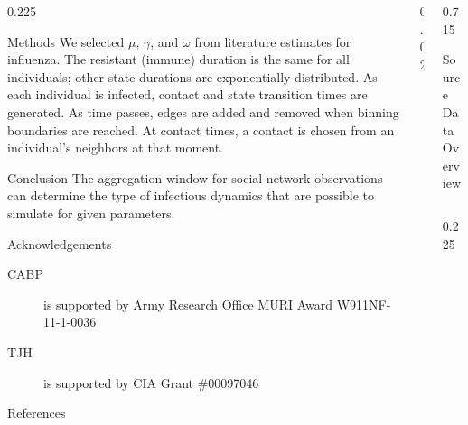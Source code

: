\documentclass[final]{beamer} %
\newcommand{\spaceProp}{0.02}
\newcommand{\spacer}{\begin{column}{\spaceProp\paperwidth}\end{column}}
\newenvironment{oneCol}{\begin{column}[t]{0.225\paperwidth}}{\end{column}}
\newenvironment{threeCol}{\begin{column}[t]{0.715\paperwidth}}{\end{column}}
\begin{document}
\begin{frame}{}
\begin{columns}[t]
\begin{oneCol}
\begin{block}{Methods}
We selected $\mu$, $\gamma$, and $\omega$ from literature estimates for influenza.  The resistant (immune) duration is the same for all individuals; other state durations are exponentially distributed.  As each individual is infected, contact and state transition times are generated.  As time passes, edges are added and removed when binning boundaries are reached.  At contact times, a contact is chosen from an individual's neighbors at that moment. 
    \end{block}
    \begin{block}{Conclusion}
The aggregation window for social network observations can determine the type of infectious dynamics that are possible to simulate for given parameters.
    \end{block}
    \begin{block}{Acknowledgements}
      \begin{description}
      \item[CABP] is supported by Army Research Office MURI Award W911NF-11-1-0036
      \item[TJH] is supported by CIA Grant \#00097046
      \end{description}
    \end{block}
    \begin{block}{References}
      \nocite{*} %
      \small{
      \vspace{0.75in}}
    \end{block}
    \end{oneCol}
    \spacer{}
    \begin{threeCol}
    \begin{block}{Source Data Overview}
    \begin{columns}
    \begin{oneCol}
      \begin{figure}

\end{figure}
\end{oneCol}
\end{columns}
\end{block}
\end{threeCol}
\end{columns}
\end{frame}
\end{document}
